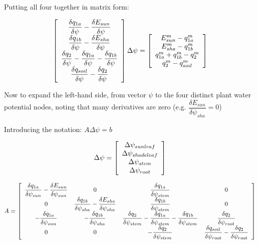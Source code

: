 \documentclass[draft,linenumbers]{agujournal}
\begin{document}
Putting all four together in matrix form:

   \begin{linenomath*} \begin{equation} 
   \left[ \begin {array}{c}
   \dfrac{\delta q_{1a}}{\delta\psi}-\dfrac{\delta E_{sun}}{\delta\psi} \cr
   \dfrac{\delta q_{1b}}{\delta\psi}-\dfrac{\delta E_{sha}}{\delta\psi} \cr
   \dfrac{\delta q_2}{\delta\psi}-\dfrac{\delta q_{1a}}{\delta\psi}-\dfrac{\delta q_{1b}}{\delta\psi} \cr
   \dfrac{\delta q_{soil}}{\delta\psi}-\dfrac{\delta q_2}{\delta\psi}
   \end {array} \right]
   \Delta\psi=
   \left[ \begin {array}{c}
   E_{sun}^{m}-q_{1a}^{m} \cr
   E_{sha}^{m}-q_{1b}^{m} \cr
   q_{1a}^{m}+q_{1b}^{m}-q_2^{m} \cr
   q_2^{m}-q_{soil}^{m}
   \end {array} \right]
   \end{equation} \end{linenomath*}

Now to expand the left-hand side, from vector $\psi$ to the four distinct plant water potential nodes, noting that many derivatives are zero (e.g. $\dfrac{\delta E_{sun}}{\delta\psi_{sha}}=0$)

Introducing the notation:
$A\Delta\psi=b$

   \begin{linenomath*} \begin{equation} 
   \Delta\psi=\left[ \begin {array}{c}
   \Delta\psi_{sunleaf} \cr
   \Delta\psi_{shadeleaf} \cr
   \Delta\psi_{stem} \cr
   \Delta\psi_{root}
   \end {array} \right] 
   \end{equation} \end{linenomath*}

   \begin{linenomath*} \begin{equation} 
   A=
   \left[ \begin {array}{cccc}
   \dfrac{\delta q_{1a}}{\delta \psi_{sun}}-\dfrac{\delta E_{sun}}{\delta \psi_{sun}}&0&\dfrac{\delta q_{1a}}{\delta \psi_{stem}}&0\cr
   0&\dfrac{\delta q_{1b}}{\delta \psi_{sha}}-\dfrac{\delta E_{sha}}{\delta \psi_{sha}}&\dfrac{\delta q_{1b}}{\delta \psi_{stem}}&0\cr
   -\dfrac{\delta q_{1a}}{\delta \psi_{sun}}&
   -\dfrac{\delta q_{1b}}{\delta \psi_{sha}}&
   \dfrac{\delta q_2}{\delta \psi_{stem}}-\dfrac{\delta q_{1a}}{\delta \psi_{stem}}-\dfrac{\delta q_{1b}}{\delta \psi_{stem}}&
   \dfrac{\delta q_2}{\delta \psi_{root}}\cr
   0&0&-\dfrac{\delta q_2}{\delta \psi_{stem}}&\dfrac{\delta q_{soil}}{\delta \psi_{root}}-\dfrac{\delta q_2}{\delta \psi_{root}}
   \end {array} \right]
   \end{equation} \end{linenomath*}
\end{document}

